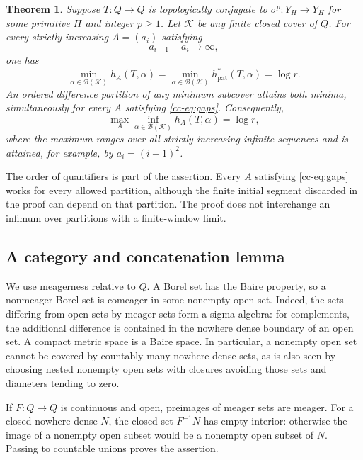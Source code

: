 \documentclass[11pt,reqno]{amsart}
\numberwithin{equation}{section}
\newtheorem{theorem}{Theorem}[section]
\theoremstyle{definition}
\newcommand{\hpat}{h_{\mathrm{pat}}^{*}}
\newcommand{\K}{\mathcal K}
\begin{document}
\begin{theorem}\label{cc-thm:cover}
Suppose $T:Q\to Q$ is topologically conjugate to $\sigma^p:Y_H\to Y_H$
for some primitive $H$ and integer $p\ge1$. Let $\K$ be any finite closed
cover of $Q$. For every strictly increasing $A=(a_i)$ satisfying
\begin{equation}\label{cc-eq:gaps}
 a_{i+1}-a_i\longrightarrow\infty,
\end{equation}
one has
\begin{equation}\label{cc-eq:coverformula}
 \min_{\alpha\in\mathcal B(\K)} h_A(T,\alpha)
 =\min_{\alpha\in\mathcal B(\K)}\hpat(T,\alpha)
 =\log r.
\end{equation}
An ordered difference partition of any minimum subcover attains both
minima, simultaneously for every $A$ satisfying \eqref{cc-eq:gaps}.
Consequently,
\begin{equation}\label{cc-eq:coverminimax}
 \max_A\inf_{\alpha\in\mathcal B(\K)}h_A(T,\alpha)=\log r,
\end{equation}
where the maximum ranges over all strictly increasing infinite sequences
and is attained, for example, by $a_i=(i-1)^2$.
\end{theorem}

The order of quantifiers is part of the assertion. Every $A$ satisfying
\eqref{cc-eq:gaps} works for every allowed partition, although the finite
initial segment discarded in the proof can depend on that partition.
The proof does not interchange an infimum over partitions with a
finite-window limit.

\subsection{A category and concatenation lemma}

We use meagerness relative to $Q$. A Borel set has the Baire property,
so a nonmeager Borel set is comeager in some nonempty open set. Indeed,
the sets differing from open sets by meager sets form a sigma-algebra:
for complements, the additional difference is contained in the
nowhere dense boundary of an open set. A compact metric space is a
Baire space. In particular, a nonempty open set cannot be covered by
countably many nowhere dense sets, as is also seen by choosing nested
nonempty open sets with closures avoiding those sets and diameters
tending to zero.

If $F:Q\to Q$ is continuous and open, preimages of meager sets are
meager. For a closed nowhere dense $N$, the closed set $F^{-1}N$ has
empty interior: otherwise the image of a nonempty open subset would be
a nonempty open subset of $N$. Passing to countable unions proves the
assertion.
\end{document}
